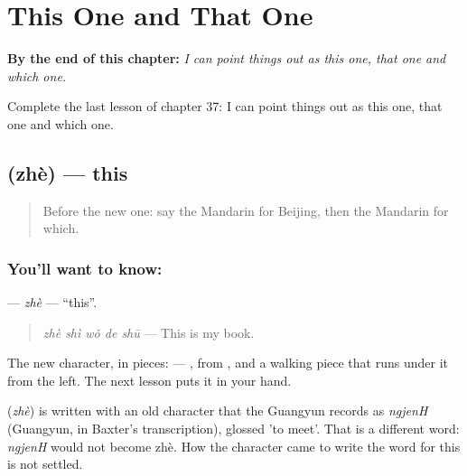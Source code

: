
\chapter{This One and That One}
\label{ch:zh-this-one-and-that-one}

\begin{chapteropening}
\textbf{By the end of this chapter:} \emph{I can point things out as this one, that one and which one.}

Complete the last lesson of chapter 37: I can point things out as this one, that one and which one.
\end{chapteropening}

\section[\texorpdfstring{\zh{这} (zhè)}{这 (zhè)}]{ (zhè) — this}

\label{lesson:ZH-C37-zhe}



\begin{quote}
Before the new one: say the Mandarin for Beijing, then the Mandarin for which.
\end{quote}

\subsection*{You'll want to know: }
\textbf{} — \emph{zhè} — \textquotedblleft{}this\textquotedblright{}.

\begin{quote}
\textbf{} \emph{zhè shì wǒ de shū} — This is my book.
\end{quote}

The new character, in pieces:  — , from , and a walking piece that runs under it from the left. The next lesson puts it in your hand.

\begin{cousinweb}
\textbf{} (\emph{zhè}) is written with an old character that the Guangyun records as \emph{ngjenH} (Guangyun, in Baxter's transcription), glossed 'to meet'. That is a different word: \emph{ngjenH} would not become zhè. How the character came to write the word for this is not settled.
\end{cousinweb}

